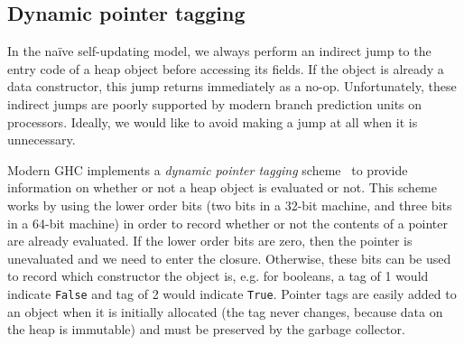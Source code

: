 



\subsection{Dynamic pointer tagging} \label{sec:tagging}

In the na\"ive self-updating model, we always perform an indirect jump
to the entry code of a heap object before accessing its fields.  If the
object is already a data constructor, this jump returns immediately as a
no-op.  Unfortunately, these indirect jumps are poorly supported by
modern branch prediction units on processors.  Ideally, we would like
to avoid making a jump at all when it is unnecessary.

Modern GHC implements a \emph{dynamic pointer tagging}
scheme~\cite{Marlow2007} to provide information on whether or not a heap
object is evaluated or not.  This scheme works by using the lower order
bits (two bits in a 32-bit machine, and three bits in a 64-bit machine)
in order to record whether or not the contents of a pointer are already
evaluated.  If the lower order bits are zero, then the pointer is
unevaluated and we need to enter the closure.  Otherwise, these bits can
be used to record which constructor the object is, e.g. for booleans, a
tag of 1 would indicate \verb|False| and tag of 2 would indicate
\verb|True|.  Pointer tags are easily added to an object when it is
initially allocated (the tag never changes, because data on the heap is
immutable) and must be preserved by the garbage collector.

